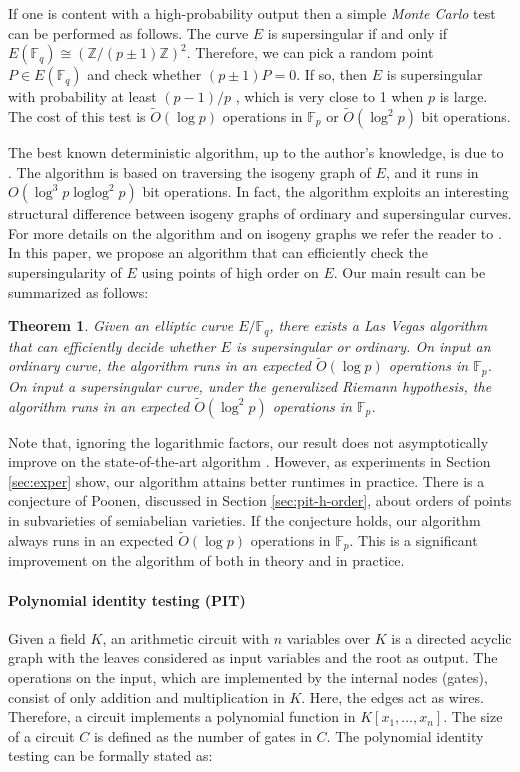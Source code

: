 \documentclass[11pt]{article}
\theoremstyle{plain}
\newtheorem{theorem}{Theorem}
\theoremstyle{definition}
\newcommand{\tildO}{\tilde{O}}
\DeclareMathOperator{\loglog}{loglog}
\def\Z{\ensuremath{\mathbb{Z}}}
\def\F{\ensuremath{\mathbb{F}}}
\begin{document}
If one is content with a high-probability output then a simple \textit{Monte Carlo} test can be 
performed as follows. The curve $E$ is supersingular if and only if $E(\F_q) \cong (\Z/(p \pm 
1)\Z)^2$. Therefore, we can pick a random point $P \in E(\F_q)$ and check whether $(p \pm 1)P = 0$. 
If so, then $E$ is supersingular with probability at least $(p - 1) / p$ \cite[Prop. 
2]{sutherland2012}, which is very close to 1 when $p$ is large. The cost of this test is 
$\tildO(\log p)$ operations in $\F_p$ or $\tildO(\log^2 p)$ bit operations.

The best known deterministic algorithm, up to the author's knowledge, is due to 
\cite{sutherland2012}. The algorithm is based on traversing the isogeny graph of $E$, and it runs 
in $O(\log^3p \loglog^2p)$ bit operations. In fact, the algorithm exploits an interesting 
structural difference between isogeny graphs of ordinary and supersingular curves. For more details 
on the algorithm and on isogeny graphs we refer the reader to \cite{sutherland2012, kohel1996}. In 
this paper, we propose an algorithm that can efficiently check the supersingularity of $E$ using 
points of high order on $E$. Our main result can be summarized as follows:
\begin{theorem}
	\label{theo:main}
	Given an elliptic curve $E/\F_q$, there exists a Las Vegas algorithm that can efficiently
	decide whether $E$ is supersingular or ordinary. On input an ordinary curve, the algorithm runs 
	in an expected $\tildO(\log p)$ operations in $\F_p$. On input a supersingular curve, under the 
	generalized Riemann hypothesis, the algorithm runs in an expected $\tildO(\log^2 p)$ operations 
	in $\F_p$.
\end{theorem}
Note that, ignoring the logarithmic factors, our result does not asymptotically improve on the 
state-of-the-art algorithm \cite{sutherland2012}. However, as experiments in Section 
\ref{sec:exper} show, our algorithm attains better runtimes in practice. There is a conjecture of 
Poonen, discussed in Section \ref{sec:pit-h-order}, about orders of points in subvarieties of 
semiabelian varieties. If the conjecture holds, our algorithm always runs in an expected 
$\tildO(\log p)$ operations in $\F_p$. This is a significant improvement on the algorithm of 
\cite{sutherland2012} both in theory and in practice.

\paragraph{Polynomial identity testing (PIT)}
Given a field $K$, an arithmetic circuit with $n$ variables over $K$ is a directed acyclic graph 
with the leaves considered as input variables and the root as output. The operations on the input, 
which are implemented by the internal nodes (gates), consist of only addition and multiplication in 
$K$. Here, the edges act as wires. Therefore, a circuit implements a polynomial function in $K[x_1, 
\dots, x_n]$. The size of a circuit $C$ is defined as the number of gates in $C$. The polynomial 
identity testing can be formally stated as: 
\end{document}
